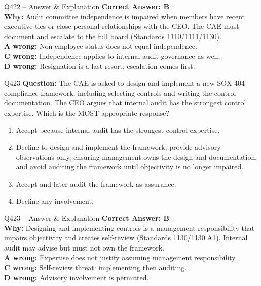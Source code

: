 \documentclass[aspectratio=169,10pt]{beamer}
\begin{document}
	\begin{frame}[t]{Q422 -- Answer \& Explanation}
		\small
		\textbf{Correct Answer: B} \\[4pt]
		\textbf{Why:} Audit committee independence is impaired when members have recent executive ties or close personal relationships with the CEO. The CAE must document and escalate to the full board (Standards 1110/1111/1130). \\[4pt]
		\textbf{A wrong:} Non-employee status does not equal independence. \\[2pt]
		\textbf{C wrong:} Independence applies to internal audit governance as well. \\[2pt]
		\textbf{D wrong:} Resignation is a last resort; escalation comes first.
	\end{frame}
	
	\begin{frame}[t]{Q423}
		\small
		\textbf{Question:} The CAE is asked to design and implement a new SOX 404 compliance framework, including selecting controls and writing the control documentation. The CEO argues that internal audit has the strongest control expertise. Which is the MOST appropriate response?
		\begin{enumerate}[label=\Alph*.,itemsep=1pt,topsep=2pt]
			\item Accept because internal audit has the strongest control expertise.
			\item Decline to design and implement the framework; provide advisory observations only, ensuring management owns the design and documentation, and avoid auditing the framework until objectivity is no longer impaired.
			\item Accept and later audit the framework as assurance.
			\item Decline any involvement.
		\end{enumerate}
	\end{frame}
	
	\begin{frame}[t]{Q423 -- Answer \& Explanation}
		\small
		\textbf{Correct Answer: B} \\[4pt]
		\textbf{Why:} Designing and implementing controls is a management responsibility that impairs objectivity and creates self-review (Standards 1130/1130.A1). Internal audit may advise but must not own the framework. \\[4pt]
		\textbf{A wrong:} Expertise does not justify assuming management responsibility. \\[2pt]
		\textbf{C wrong:} Self-review threat: implementing then auditing. \\[2pt]
		\textbf{D wrong:} Advisory involvement is permitted.
	\end{frame}
	
\end{document}
